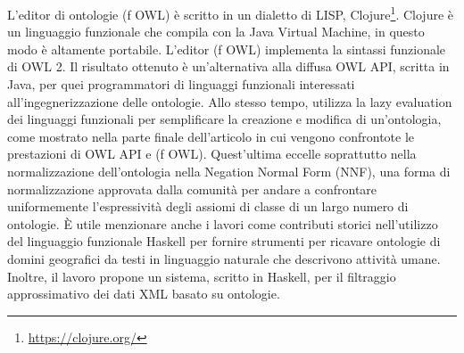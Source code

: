 L'editor di ontologie (f OWL) \cite{fOWL} è scritto in un dialetto di LISP, Clojure\footnote{\url{https://clojure.org/}}. Clojure è un linguaggio funzionale che compila con la Java Virtual Machine, in questo modo è altamente portabile. L'editor (f OWL) implementa la sintassi funzionale di OWL 2. Il risultato ottenuto è un'alternativa alla diffusa OWL API, scritta in Java, per quei programmatori di linguaggi funzionali interessati all'ingegnerizzazione delle ontologie. Allo stesso tempo, utilizza la lazy evaluation dei linguaggi funzionali per semplificare la creazione e modifica di un'ontologia, come mostrato nella parte finale dell'articolo in cui vengono confrontote le prestazioni di OWL API e (f OWL). Quest'ultima eccelle soprattutto nella normalizzazione dell'ontologia nella Negation Normal Form (NNF), una forma di normalizzazione approvata dalla comunità per andare a confrontare uniformemente l'espressività degli assiomi di classe di un largo numero di ontologie.
\noindent
È utile menzionare anche i lavori \cite{khun1995ontology, kuhngeo2001} come contributi storici nell'utilizzo del linguaggio funzionale Haskell \cite{o2008real} per fornire strumenti per ricavare ontologie di domini geografici da testi in linguaggio naturale che descrivono attività umane. Inoltre, il lavoro \cite{baggi2008XMLFiltering} propone un sistema, scritto in Haskell, per il filtraggio approssimativo dei dati XML basato su ontologie.

